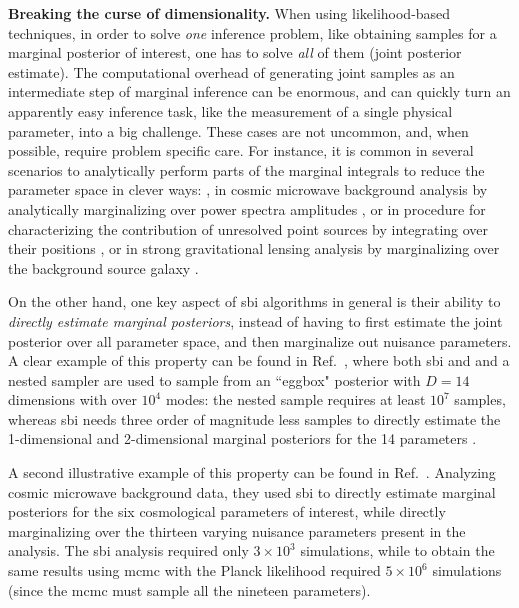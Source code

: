\noindent \textbf{Breaking the curse of dimensionality.} When using likelihood-based techniques, in order to solve \emph{one} inference problem, like obtaining samples for a marginal posterior of interest, one has to solve \emph{all} of them (joint posterior estimate). The computational overhead of generating joint samples as an intermediate step of marginal inference can be enormous, and can quickly turn an apparently easy inference task, like the measurement of a single physical parameter, into a big challenge. These cases are not uncommon, and, when possible, require problem specific care. For instance, it is common in several scenarios to analytically perform parts of the marginal integrals to reduce the parameter space in clever ways: \eg, in cosmic microwave background analysis by analytically marginalizing over power spectra amplitudes \cite{Gerbino:2019okg}, or in procedure for characterizing the contribution of unresolved point sources by integrating over their positions \cite{Mishra-Sharma:2016gis}, or in strong gravitational lensing analysis by marginalizing over the background source galaxy \cite{Vegetti:2008eg}.

On the other hand, one key aspect of \gls*{sbi} algorithms in general is their ability to \emph{directly estimate marginal posteriors}, instead of having to first estimate the joint posterior over all parameter space, and then marginalize out nuisance parameters. A clear example of this property can be found in Ref.~\cite{Miller:2020hua}, where both \gls*{sbi} and and a nested sampler are used to sample from an ``eggbox" posterior with $D=14$ dimensions with over $10^4$ modes: the nested sample requires at least $10^7$ samples, whereas \gls*{sbi} needs three order of magnitude less samples to directly estimate the 1-dimensional and 2-dimensional marginal posteriors for the 14 parameters \cite[Figure 2 in][]{Miller:2020hua}. 

A second illustrative example of this property can be found in Ref.~\cite{Cole:2021gwr}. Analyzing cosmic microwave background data, they used \gls*{sbi} to directly estimate marginal posteriors for the six cosmological parameters of interest, while directly marginalizing over the thirteen varying nuisance parameters present in the analysis. The \gls*{sbi} analysis required only $3\times10^3$ simulations, while to obtain the same results using \gls*{mcmc} with the Planck likelihood required $5\times10^6$ simulations (since the \gls*{mcmc} must sample all the nineteen parameters). 

